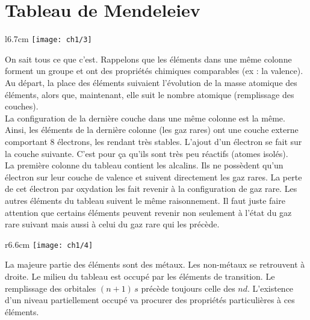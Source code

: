 	\section{Tableau de Mendeleiev}
	\begin{wrapfigure}[11]{l}{6.7cm}
	\vspace{-5mm}
	\texttt{[image: ch1/3]}
	\end{wrapfigure}
	On sait tous ce que c'est. Rappelons que les éléments dans une même colonne forment un groupe et ont des propriétés chimiques comparables (ex : la valence). Au départ, la place des éléments suivaient l'évolution de la masse atomique des éléments, alors que, maintenant, elle suit le nombre atomique (remplissage des couches).\\
	La configuration de la dernière couche dans une même colonne est la même. Ainsi, les éléments de la dernière colonne (les gaz rares) ont une couche externe comportant 8 électrons, les rendant très stables. L'ajout d'un électron se fait sur la couche suivante. C'est pour ça qu'ils sont très peu réactifs (atomes isolés). \\
	La première colonne du tableau contient les alcalins. Ils ne possèdent qu'un électron sur leur couche de valence et suivent directement les gaz rares. La perte de cet électron par oxydation les fait revenir à la configuration de gaz rare. Les autres éléments du tableau suivent le même raisonnement. Il faut juste faire attention que certains éléments peuvent revenir non seulement à l'état du gaz rare suivant mais aussi à celui du gaz rare qui les précède. \\
	
	\begin{wrapfigure}[9]{r}{6.6cm}
	\vspace{-5mm}
	\texttt{[image: ch1/4]}
	\end{wrapfigure}
	La majeure partie des éléments sont des métaux. Les non-métaux se retrouvent à droite. Le milieu du tableau est occupé par les éléments de transition. Le remplissage des orbitales $(n+1) \, s$ précède toujours celle des $nd$. L'existence d'un niveau partiellement occupé va procurer des propriétés particulières à ces éléments.
	
	
	
	